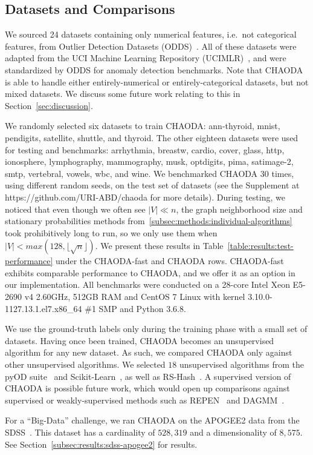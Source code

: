 \subsection{Datasets and Comparisons}
\label{subsec:methods:datasets-and-comparisons}

We sourced 24 datasets containing only numerical features, i.e.\ not categorical features, from Outlier Detection Datasets (ODDS)~\cite{rayana2016odds}.
All of these datasets were adapted from the UCI Machine Learning Repository (UCIMLR)~\cite{UCIMLR}, and were standardized by ODDS for anomaly detection benchmarks.
Note that CHAODA is able to handle either entirely-numerical or entirely-categorical datasets, but not mixed datasets.
We discuss some future work relating to this in Section~\ref{sec:discussion}.

We randomly selected six datasets to train CHAODA: ann-thyroid, mnist, pendigits, satellite, shuttle, and thyroid.
The other eighteen datasets were used for testing and benchmarks: arrhythmia, breastw, cardio, cover, glass, http, ionosphere, lymphography, mammography, musk, optdigits, pima, satimage-2, smtp, vertebral, vowels, wbc, and wine.
We benchmarked CHAODA 30 times, using different random seeds, on the test set of datasets (see the Supplement at https://github.com/URI-ABD/chaoda for more details).
During testing, we noticed that even though we often see $|V| \ll n $, the graph neighborhood size and stationary probabilities methods from~\ref{subsec:methods:individual-algorithms} took prohibitively long to run, so we only use them when $|V| < max(128, \lfloor \sqrt n \rfloor)$.
We present these results in Table~\ref{table:results:test-performance} under the CHAODA-fast and CHAODA rows.
CHAODA-fast exhibits comparable performance to CHAODA, and we offer it as an option in our implementation.
All benchmarks were conducted on a 28-core Intel Xeon E5-2690 v4 2.60GHz, 512GB RAM and CentOS 7 Linux with kernel 3.10.0-1127.13.1.el7.x86\_64 \#1 SMP and Python 3.6.8.

We use the ground-truth labels only during the training phase with a small set of datasets.
Having once been trained, CHAODA becomes an unsupervised algorithm for any new dataset.
As such, we compared CHAODA only against other unsupervised algorithms.
We selected $18$ unsupervised algorithms from the pyOD suite~\cite{zhao2019pyod} and Scikit-Learn~\cite{pedregosa2011scikit}, as well as RS-Hash~\cite{sathe2016subspace}.
A supervised version of CHAODA is possible future work, which would open up comparisons against supervised or weakly-supervised methods such as REPEN~\cite{pang2018learning} and DAGMM~\cite{zong2018deep}.

For a ``Big-Data'' challenge, we ran CHAODA on the APOGEE2 data from the SDSS~\cite{blanton2017sdss}.
This dataset has a cardinality of $528,319$ and a dimensionality of $8,575$.
See Section~\ref{subsec:results:sdss-apogee2} for results.
